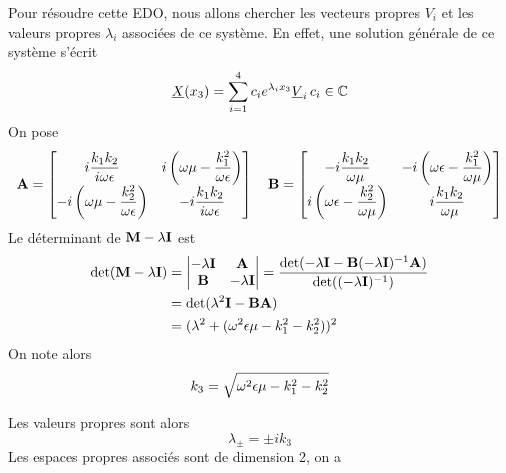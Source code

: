 Pour résoudre cette EDO, nous allons chercher les vecteurs propres $V_i$ et les valeurs propres $\lambda_i$ associées de ce système. En effet, une solution générale de ce système s'écrit
\begin{equation}
    \underline{X}(x_3)= \sum\limits_{i=1}^{4}c_i e^{\lambda_i x_3} \underline{V}_i \, c_i \in \mathbb C
\end{equation}
On pose 
\begin{equation}
    \mathbf{A} = \begin{bmatrix}
        i\dfrac{k_1k_2}{i\omega\epsilon} & i\left(\omega\mu - \dfrac{k_1^2}{\omega\epsilon}\right) \\
        -i\left(\omega\mu - \dfrac{k_2^2}{\omega\epsilon}\right) & -i\dfrac{k_1k_2}{i\omega\epsilon} \\
    \end{bmatrix}
    \quad
    \mathbf{B} = \begin{bmatrix}
        -i\dfrac{k_1k_2}{\omega\mu} & -i\left(\omega\epsilon - \dfrac{k_1^2}{\omega\mu}\right) \\
        i\left(\omega\epsilon - \dfrac{k_2^2}{\omega\mu}\right) & i\dfrac{k_1k_2}{\omega\mu} \\
    \end{bmatrix}
\end{equation}
Le déterminant de $\mathbf{M}-\lambda \mathbf{I}$ est
\begin{align*}
    \det(\mathbf{M}-\lambda \mathbf{I}) &= 
    \begin{vmatrix}
        -\lambda \mathbf{I} & \mathbf{A} \\
        \mathbf{B} & -\lambda \mathbf{I}
    \end{vmatrix}
        = \dfrac{\det(- \lambda \mathbf{I} - \mathbf{B}(-\lambda \mathbf{I})^{-1} \mathbf{A})}{\det((-\lambda \mathbf{I})^{-1})} \\
        &= \det(\lambda^2 \mathbf{I} - \mathbf{B}\mathbf{A}) \\
        &= (\lambda^2 + (\omega^2\epsilon\mu - k_1^2 -k_2^2))^2
\end{align*}
On note alors 
\begin{equation}
k_3=\sqrt{\omega^2\epsilon\mu - k_1^2 -k_2^2}
\end{equation}

Les valeurs propres sont alors 
\begin{equation}
    \lambda_\pm = \pm i k_3
\end{equation}
Les espaces propres associés sont de dimension 2, on a 

